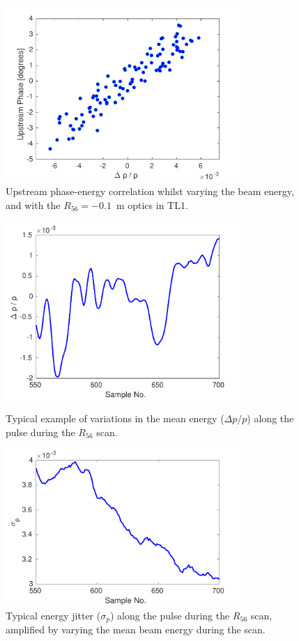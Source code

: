 \begin{figure}
  \centering
  \includegraphics[width=0.8\textwidth]{Figures/propagation/R56ScanGunWiggle_UpEnCorr}
  \caption{Upstream phase-energy correlation whilst varying the beam energy, and with the \(R_{56}=-0.1\)~m optics in TL1.}
  \label{f:R56ScanGunWiggle_UpEnCorr}
\end{figure}

\begin{figure}
  \centering
  \includegraphics[width=0.8\textwidth]{Figures/propagation/R56ScanGunWiggle_MeanEnergyAlong}
  \caption{Typical example of variations in the mean energy (\(\Delta p/p\)) along the pulse during the \(R_{56}\) scan.}
  \label{f:R56ScanGunWiggle_MeanEnergyAlong}
  \includegraphics[width=0.8\textwidth]{Figures/propagation/R56ScanGunWiggle_EnergyJitterAlong}
  \caption{Typical energy jitter (\(\sigma_p\)) along the pulse during the \(R_{56}\) scan, amplified by varying the mean beam energy during the scan.}
  \label{f:R56ScanGunWiggle_EnergyJitterAlong}
\end{figure}

